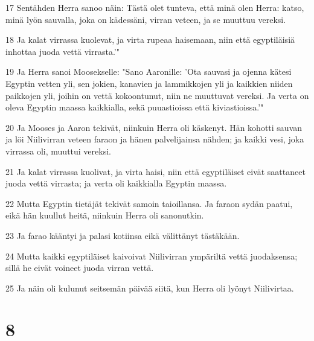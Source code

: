 \par 17 Sentähden Herra sanoo näin: Tästä olet tunteva, että minä olen Herra: katso, minä lyön sauvalla, joka on kädessäni, virran veteen, ja se muuttuu vereksi.
\par 18 Ja kalat virrassa kuolevat, ja virta rupeaa haisemaan, niin että egyptiläisiä inhottaa juoda vettä virrasta.'"
\par 19 Ja Herra sanoi Moosekselle: "Sano Aaronille: 'Ota sauvasi ja ojenna kätesi Egyptin vetten yli, sen jokien, kanavien ja lammikkojen yli ja kaikkien niiden paikkojen yli, joihin on vettä kokoontunut, niin ne muuttuvat vereksi. Ja verta on oleva Egyptin maassa kaikkialla, sekä puuastioissa että kiviastioissa.'"
\par 20 Ja Mooses ja Aaron tekivät, niinkuin Herra oli käskenyt. Hän kohotti sauvan ja löi Niilivirran veteen faraon ja hänen palvelijainsa nähden; ja kaikki vesi, joka virrassa oli, muuttui vereksi.
\par 21 Ja kalat virrassa kuolivat, ja virta haisi, niin että egyptiläiset eivät saattaneet juoda vettä virrasta; ja verta oli kaikkialla Egyptin maassa.
\par 22 Mutta Egyptin tietäjät tekivät samoin taioillansa. Ja faraon sydän paatui, eikä hän kuullut heitä, niinkuin Herra oli sanonutkin.
\par 23 Ja farao kääntyi ja palasi kotiinsa eikä välittänyt tästäkään.
\par 24 Mutta kaikki egyptiläiset kaivoivat Niilivirran ympäriltä vettä juodaksensa; sillä he eivät voineet juoda virran vettä.
\par 25 Ja näin oli kulunut seitsemän päivää siitä, kun Herra oli lyönyt Niilivirtaa.

\chapter{8}

